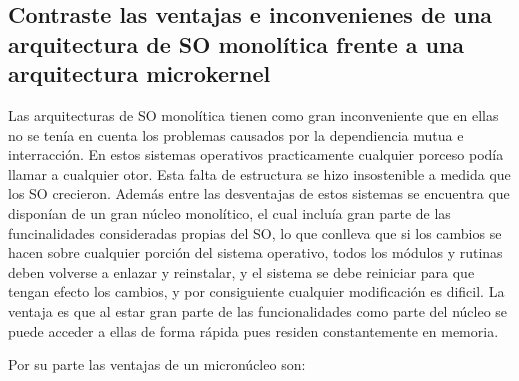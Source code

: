 \documentclass{article}
\begin{document}
				\subsection[Pregunta 3]{Contraste las ventajas e inconvenienes de una arquitectura de SO monolítica frente a una arquitectura microkernel}
					Las arquitecturas de SO monolítica tienen como gran inconveniente que en ellas no se tenía en cuenta los problemas causados por la dependiencia mutua e interracción. En estos sistemas operativos practicamente cualquier porceso podía llamar a cualquier otor. Esta falta de estructura se hizo insostenible a medida que los SO crecieron. Además entre las desventajas de estos sistemas se encuentra que disponían de un gran núcleo monolítico, el cual incluía gran parte de las funcinalidades consideradas propias del SO, lo que conlleva que si los cambios se hacen sobre cualquier porción del sistema operativo, todos los módulos y rutinas deben volverse a enlazar y reinstalar, y el sistema se debe reiniciar para que tengan efecto los cambios, y por consiguiente cualquier modificación es dificil. La ventaja es que al estar gran parte de las funcionalidades como parte del núcleo se puede acceder a ellas de forma rápida pues residen constantemente en memoria.
					
					Por su parte las ventajas de un micronúcleo son:
					
\end{document}

